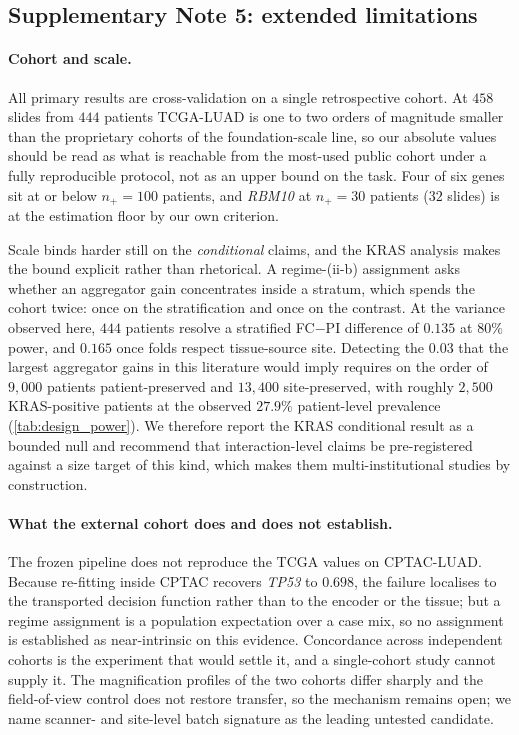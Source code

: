 \subsection*{Supplementary Note 5: extended limitations}

\paragraph{Cohort and scale.}
All primary results are cross-validation on a single
retrospective cohort. At $458$ slides from $444$ patients TCGA-LUAD is
one to two orders of
magnitude smaller than the proprietary cohorts of the foundation-scale
line, so our absolute values should be read as what is reachable from the
most-used public cohort under a fully reproducible protocol, not as an
upper bound on the task. Four of six genes sit at or below
$n_+\!=\!100$ patients, and \textit{RBM10} at $n_+\!=\!30$ patients
($32$ slides) is at the estimation floor by our own criterion.

Scale binds harder still on the \emph{conditional} claims, and the KRAS
analysis makes the bound explicit rather than rhetorical. A regime-(ii-b)
assignment asks whether an aggregator gain concentrates inside a
stratum, which spends the cohort twice: once on the stratification and
once on the contrast. At the variance observed here, $444$ patients
resolve a stratified FC${-}$PI difference of $0.135$ \auroc{} at $80\%$
power, and $0.165$ once folds respect tissue-source site. Detecting the
$0.03$ that the largest aggregator gains in this literature would imply
requires on the order of $9{,}000$ patients patient-preserved and
$13{,}400$ site-preserved, with roughly $2{,}500$ KRAS-positive patients
at the observed $27.9\%$ patient-level prevalence
(\cref{tab:design_power}). We therefore report the KRAS conditional
result as a bounded null and recommend that interaction-level claims be
pre-registered against a size target of this kind, which makes them
multi-institutional studies by construction.

\paragraph{What the external cohort does and does not establish.}
The frozen pipeline does not reproduce the TCGA values on CPTAC-LUAD.
Because re-fitting inside CPTAC recovers \textit{TP53} to $0.698$, the
failure localises to the transported decision function rather than to the
encoder or the tissue; but a regime assignment is a population
expectation over a case mix, so no assignment is established as
near-intrinsic on this evidence. Concordance across independent cohorts
is the experiment that would settle it, and a single-cohort study cannot
supply it. The magnification profiles of the two cohorts differ sharply
and the field-of-view control does not restore transfer, so the
mechanism remains open; we name scanner- and site-level batch
signature\cite{howard2021site} as the leading untested candidate.

